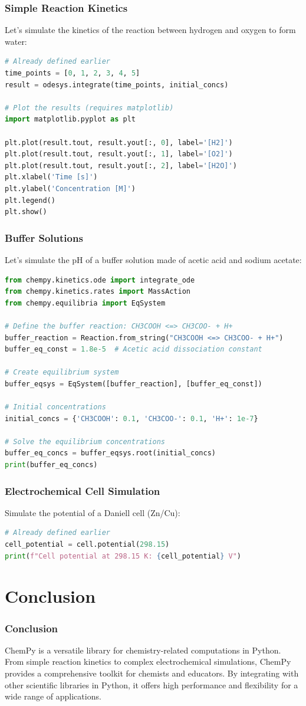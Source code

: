 \documentclass[aspectratio=169]{beamer}
\begin{document}
\begin{frame}[fragile]
    \frametitle{Simple Reaction Kinetics}
    Let's simulate the kinetics of the reaction between hydrogen and oxygen to form water:
    \begin{lstlisting}[language=python]
# Already defined earlier
time_points = [0, 1, 2, 3, 4, 5]
result = odesys.integrate(time_points, initial_concs)

# Plot the results (requires matplotlib)
import matplotlib.pyplot as plt

plt.plot(result.tout, result.yout[:, 0], label='[H2]')
plt.plot(result.tout, result.yout[:, 1], label='[O2]')
plt.plot(result.tout, result.yout[:, 2], label='[H2O]')
plt.xlabel('Time [s]')
plt.ylabel('Concentration [M]')
plt.legend()
plt.show()
    \end{lstlisting}
\end{frame}

\begin{frame}[fragile]
    \frametitle{Buffer Solutions}
    Let's simulate the pH of a buffer solution made of acetic acid and sodium acetate:
    \begin{lstlisting}[language=python]
from chempy.kinetics.ode import integrate_ode
from chempy.kinetics.rates import MassAction
from chempy.equilibria import EqSystem

# Define the buffer reaction: CH3COOH <=> CH3COO- + H+
buffer_reaction = Reaction.from_string("CH3COOH <=> CH3COO- + H+")
buffer_eq_const = 1.8e-5  # Acetic acid dissociation constant

# Create equilibrium system
buffer_eqsys = EqSystem([buffer_reaction], [buffer_eq_const])

# Initial concentrations
initial_concs = {'CH3COOH': 0.1, 'CH3COO-': 0.1, 'H+': 1e-7}

# Solve the equilibrium concentrations
buffer_eq_concs = buffer_eqsys.root(initial_concs)
print(buffer_eq_concs)
    \end{lstlisting}
\end{frame}

\begin{frame}[fragile]
    \frametitle{Electrochemical Cell Simulation}
    Simulate the potential of a Daniell cell (Zn/Cu):
    \begin{lstlisting}[language=python]
# Already defined earlier
cell_potential = cell.potential(298.15)
print(f"Cell potential at 298.15 K: {cell_potential} V")
    \end{lstlisting}
\end{frame}

\section{Conclusion}

\begin{frame}
    \frametitle{Conclusion}
    ChemPy is a versatile library for chemistry-related computations in Python. From simple reaction kinetics to complex electrochemical simulations, ChemPy provides a comprehensive toolkit for chemists and educators. By integrating with other scientific libraries in Python, it offers high performance and flexibility for a wide range of applications.
\end{frame}
\end{document}
